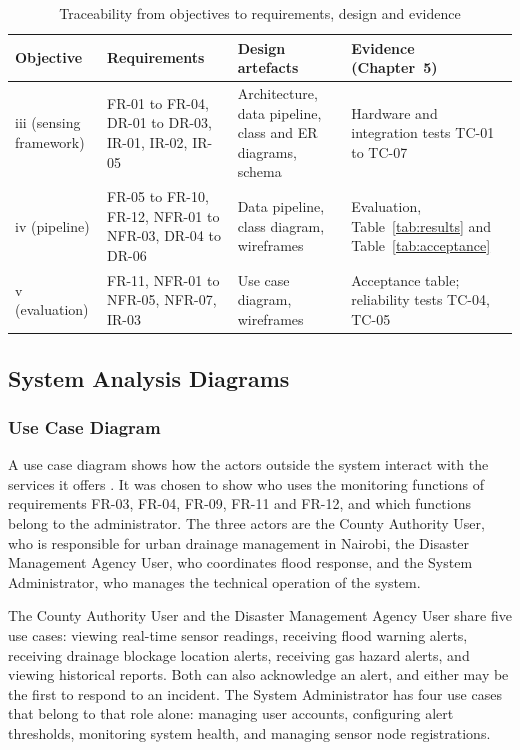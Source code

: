 \documentclass[12pt, a4paper]{article}
\begin{document}
\begin{table}[H]
\centering

\begin{tabular}{|p{1.6cm}|p{3.9cm}|p{4.1cm}|p{3.9cm}|}
\hline
\textbf{Objective} & \textbf{Requirements} & \textbf{Design artefacts} & \textbf{Evidence (Chapter~5)} \\
\hline
iii (sensing framework) & FR-01 to FR-04, DR-01 to DR-03, IR-01, IR-02, IR-05 & Architecture, data pipeline, class and ER diagrams, schema & Hardware and integration tests TC-01 to TC-07 \\
\hline
iv (pipeline) & FR-05 to FR-10, FR-12, NFR-01 to NFR-03, DR-04 to DR-06 & Data pipeline, class diagram, wireframes & Evaluation, Table~\ref{tab:results} and Table~\ref{tab:acceptance} \\
\hline
v (evaluation) & FR-11, NFR-01 to NFR-05, NFR-07, IR-03 & Use case diagram, wireframes & Acceptance table; reliability tests TC-04, TC-05 \\
\hline
\end{tabular}
\caption{Traceability from objectives to requirements, design and evidence}
\label{tab:trace}
\end{table}

\clearpage
\subsection{System Analysis Diagrams}
\label{sec:analysis-diagrams}

\subsubsection{Use Case Diagram}

A use case diagram shows how the actors outside the system interact with the services it offers \citep{booch2005}. It was chosen to show who uses the monitoring functions of requirements FR-03, FR-04, FR-09, FR-11 and FR-12, and which functions belong to the administrator. The three actors are the County Authority User, who is responsible for urban drainage management in Nairobi, the Disaster Management Agency User, who coordinates flood response, and the System Administrator, who manages the technical operation of the system.

The County Authority User and the Disaster Management Agency User share five use cases: viewing real-time sensor readings, receiving flood warning alerts, receiving drainage blockage location alerts, receiving gas hazard alerts, and viewing historical reports. Both can also acknowledge an alert, and either may be the first to respond to an incident. The System Administrator has four use cases that belong to that role alone: managing user accounts, configuring alert thresholds, monitoring system health, and managing sensor node registrations.
\end{document}
